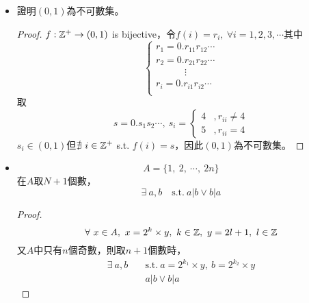 \begin{itemize}
    \item 證明$(0, 1)$為不可數集。 \\
    \begin{proof}
        $f: \mathbb{Z}^+ \rightarrow (0, 1)$ is bijective，令$f(i) = r_i, \ \forall i = 1, 2, 3, \cdots$其中 \\ \begin{equation}
            \begin{cases}
                r_1 = 0.r_{11}r_{12}\cdots \\
                r_2 = 0.r_{21}r_{22}\cdots \\
                \quad \quad \quad \vdots \\
                r_i = 0.r_{i1}r_{i2}\cdots \\
            \end{cases}
        \end{equation} 取 \begin{equation}
            s = 0.s_1s_2\cdots, \ s_i = \begin{cases}
                4 &, r_{ii} \neq 4 \\
                5 &, r_{ii} = 4
            \end{cases}
        \end{equation} $s_i \in (0, 1)$但$\nexists \ i \in \mathbb{Z}^+$ s.t. $f(i) = s$，因此$(0, 1)$為不可數集。
    \end{proof}
    \item \begin{equation}
        A = \{1, \ 2, \ \cdots, \ 2n\}
    \end{equation} 在$A$取$N + 1$個數，\begin{equation}
        \exists \ a, b \quad \text{s.t.} \ a | b \lor b | a
    \end{equation}
    \begin{proof}
        \begin{equation}
            \forall \ x \in A, \ x = 2^k \times y, \ k \in \mathbb{Z}, \ y = 2l + 1, \ l \in \mathbb{Z}
        \end{equation} 又$A$中只有$n$個奇數，則取$n + 1$個數時， \begin{equation}
            \begin{aligned}
                \exists \ a, b \quad & \text{s.t.} \ a = 2^{k_1} \times y, \ b = 2^{k_2} \times y \\
                & a | b \lor b | a
            \end{aligned}
        \end{equation}
    \end{proof}

\end{itemize}
